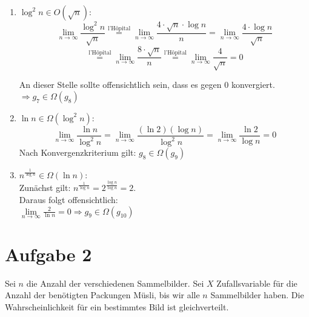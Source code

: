 \documentclass[11pt,a4paper,ngerman]{article}
\begin{document}
\begin{description}
\begin{enumerate}[\bfseries 1.]
\item
$\log^2 n \in O (\sqrt{n})$: \\
$$\underset{n\rightarrow\infty}{\lim} \frac{\log^2 n}{\sqrt{n}} \stackrel{\text{l'Hôpital}}{=} \underset{n\rightarrow\infty}{\lim} \frac{4\cdot\sqrt{n} \cdot  \log n}{n} = \underset{n\rightarrow\infty}{\lim} \frac{4\cdot \log n}{\sqrt{n} } $$
$$
\stackrel{\text{l'Hôpital}}{=} \underset{n\rightarrow\infty}{\lim} \frac{8\cdot \sqrt{n}}{n} \stackrel{\text{l'Hôpital}}{=} \underset{n\rightarrow\infty}{\lim} \frac{4}{\sqrt{n}} = 0
$$

An dieser Stelle sollte offensichtlich sein, dass es gegen 0 konvergiert.\\ $\Rightarrow g_7 \in \Omega (g_8)$

\item
$\ln n \in \Omega (\log^2 n)$: \\
$$\underset{n\rightarrow\infty}{\lim} \frac{\ln n}{\log^2 n} = \underset{n\rightarrow\infty}{\lim} \frac{(\ln 2)(\log n)}{\log^2 n} = \underset{n\rightarrow\infty}{\lim} \frac{\ln 2}{\log n} = 0$$
Nach Konvergenzkriterium gilt: $g_8 \in \Omega(g_9)$
\item
$n^{\frac{1}{\log n}} \in \Omega (\ln n)$: \\
Zunächst gilt: $n^{\frac{1}{\log n}} = 2^{\frac{\log n}{\log n}} = 2$.\\
Daraus folgt offensichtlich:\\
$\underset{n\rightarrow\infty}{\lim} \frac{2}{\ln n} = 0 \Rightarrow g_9 \in \Omega (g_{10})$

\end{enumerate}
\end{description}


\section*{Aufgabe 2}

Sei $n$ die Anzahl der verschiedenen Sammelbilder. Sei $X$ Zufallsvariable für die Anzahl der benötigten Packungen Müsli, bis wir alle $n$ Sammelbilder haben. Die Wahrscheinlichkeit für ein bestimmtes Bild ist gleichverteilt.

\end{document}
